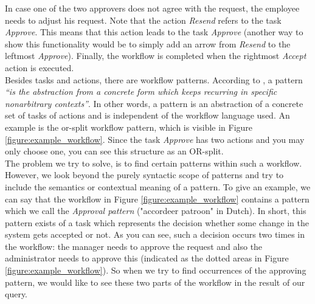 \documentclass[a4paper,11pt]{article}
\begin{document}
In case one of the two approvers does not agree with the request, the employee needs to adjust his request. Note that the action \textit{Resend} refers to the task \textit{Approve}. This means that this action leads to the task \textit{Approve} (another way to show this functionality would be to simply add an arrow from \textit{Resend} to the leftmost \textit{Approve}). Finally, the workflow is completed when the rightmost \textit{Accept} action is executed.\\
Besides tasks and actions, there are workflow patterns. According to \cite{Riehle1996}, a pattern \textit{“is the abstraction from a concrete form which keeps recurring in specific nonarbitrary contexts”}. In other words, a pattern is an abstraction of a concrete set of tasks of actions and is independent of the workflow language used. An example is the or-split workflow pattern, which is visible in Figure \ref{figure:example_workflow}. Since the task \textit{Approve} has two actions and you may only choose one, you can see this structure as an OR-split.\\
The problem we try to solve, is to find certain patterns within such a workflow. However, we look beyond the purely syntactic scope of patterns and try to include the semantics or contextual meaning of a pattern. To give an example, we can say that the workflow in Figure \ref{figure:example_workflow} contains a pattern which we call the \textit{Approval pattern} ("accordeer patroon" in Dutch). In short, this pattern exists of a task which represents the decision whether some change in the system gets accepted or not. As you can see, such a decision occurs two times in the workflow: the manager needs to approve the request and also the administrator needs to approve this (indicated as the dotted areas in Figure \ref{figure:example_workflow}). So when we try to find occurrences of the approving pattern, we would like to see these two parts of the workflow in the result of our query.
\end{document}
